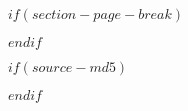 \usepackage{bold-extra}
\usepackage[perpage,symbol*]{footmisc}
\usepackage[labelformat=empty]{caption}

$if(section-page-break)$
\usepackage{titlesec}
$endif$

$if(source-md5)$
$endif$
